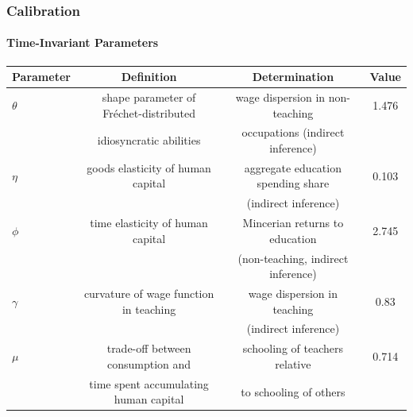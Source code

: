\documentclass[11pt,hyperref={bookmarks=false},table,aspectratio=169]{beamer}
\begin{document}
\begin{frame}
	\frametitle{Calibration}
	\framesubtitle{Time-Invariant Parameters}
	\footnotesize
	\begin{table}[h!]
		\centering
		\begin{tabular}{lccc}
			\toprule
			Parameter & Definition & Determination & Value\\
			\midrule
			$\theta$ & shape parameter of Fr\'echet-distributed & wage dispersion in non-teaching & 1.476\\
			& idiosyncratic abilities &  occupations (indirect inference) &\\
			$\eta$ & goods elasticity of human capital & aggregate education spending share  & 0.103\\
			& & (indirect inference) &\\
			$\phi$ & time elasticity of human capital & Mincerian returns to education & 2.745\\
			& & (non-teaching, indirect inference) &\\
			$\gamma$ & curvature of wage function in teaching & wage dispersion in teaching & 0.83\\
			&& (indirect inference) &\\
			$\mu$ &  trade-off between consumption and & schooling of teachers relative & 0.714\\
			& time spent accumulating human capital & to schooling of others & \\
			\bottomrule
		\end{tabular}
		\label{tab:param}
	\end{table}
\end{frame}
\end{document}
